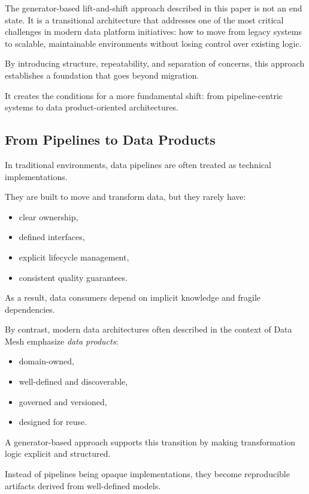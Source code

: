 \documentclass[11pt,a4paper]{article}
\begin{document}
The generator-based lift-and-shift approach described in this paper is not an end state. It is a transitional architecture that addresses one of the most critical challenges in modern data platform initiatives: how to move from legacy systems to scalable, maintainable environments without losing control over existing logic.

By introducing structure, repeatability, and separation of concerns, this approach establishes a foundation that goes beyond migration.

It creates the conditions for a more fundamental shift: from pipeline-centric systems to data product-oriented architectures.

\subsection{From Pipelines to Data Products}

In traditional environments, data pipelines are often treated as technical implementations.

They are built to move and transform data, but they rarely have:
\begin{itemize}
  \item clear ownership,
  \item defined interfaces,
  \item explicit lifecycle management,
  \item consistent quality guarantees.
\end{itemize}

As a result, data consumers depend on implicit knowledge and fragile dependencies.

By contrast, modern data architectures \textendash{} often described in the context of Data Mesh \textendash{}emphasize \emph{data products}:
\begin{itemize}
  \item domain-owned,
  \item well-defined and discoverable,
  \item governed and versioned,
  \item designed for reuse.
\end{itemize}

A generator-based approach supports this transition by making transformation logic explicit and structured.

Instead of pipelines being opaque implementations, they become reproducible artifacts derived from well-defined models.
\end{document}
